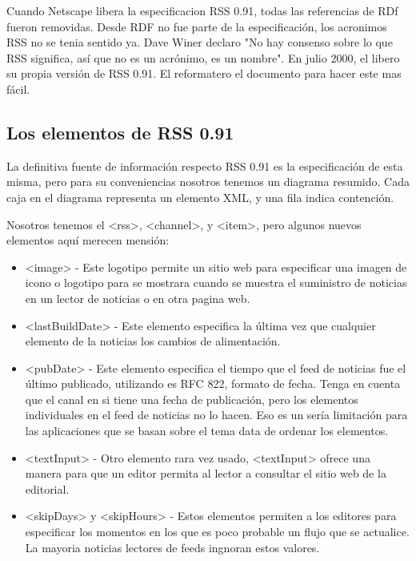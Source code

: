 Cuando Netscape libera la especificacion RSS 0.91, todas las referencias de RDf fueron removidas.
Desde RDF no fue parte de la especificación, los acronimos RSS no se tenia sentido ya. Dave Winer
declaro "No hay consenso sobre lo que RSS significa, así  que no es un acrónimo, es un nombre".
En julio 2000, el libero su propia versi\'{o}n de RSS 0.91. El reformatero el documento para hacer
este mas f\'{a}cil.

\subsection{Los elementos de RSS 0.91}

La definitiva fuente de informaci\'{o}n respecto RSS 0.91 es la especificación de esta misma, pero 
para su conveniencias nosotros tenemos un diagrama resumido. Cada caja en el diagrama representa
un elemento XML, y una fila indica contención.

Nosotros tenemos el <rss>, <channel>, y <item>, pero algunos nuevos elementos aquí merecen mensión:

\begin{itemize}

\item <image> - Este logotipo permite un sitio web para especificar una imagen de icono o logotipo para
se mostrara cuando se muestra el suministro de noticias en un lector de noticias o en otra pagina web.

\item <lastBuildDate> - Este elemento especifica la última vez que cualquier elemento de la noticias los
cambios de alimentación.

\item <pubDate> - Este elemento especifica el tiempo que el feed de noticias fue el último publicado, utilizando
es RFC 822, formato de fecha. Tenga en cuenta que el canal en si tiene una fecha de publicación, pero los
elementos individuales en el feed de noticias no lo hacen. Eso es un sería limitación para las aplicaciones
que se basan sobre el tema data de ordenar los elementos.

\item <textInput> - Otro elemento rara vez usado, <textInput> ofrece una manera para que un editor permita al
lector a consultar el sitio web de la editorial.

\item <skipDays> y <skipHours> - Estos elementos permiten a los editores para especificar los momentos en los
que es poco probable un flujo que se actualice. La mayoria noticias lectores de feeds ingnoran estos
valores.

\end{itemize}

